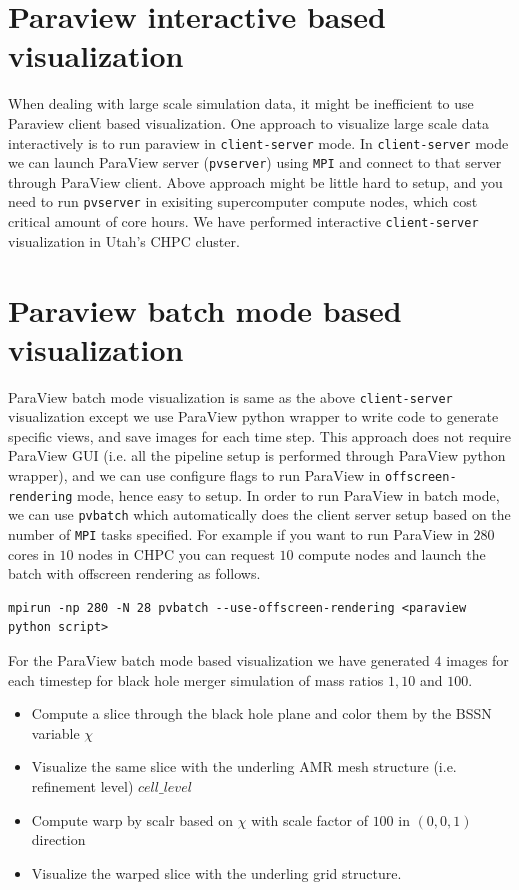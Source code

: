 \section{Paraview interactive based visualization}
When dealing with large scale simulation data, it might be inefficient to use Paraview client based visualization. One approach to visualize large scale data interactively is to run paraview in \texttt{client-server} mode. 
In \texttt{client-server} mode we can launch ParaView server (\texttt{pvserver}) using \texttt{MPI} and connect to that server through ParaView client. Above approach might be little hard to setup, and you need to run \texttt{pvserver} in 
exisiting supercomputer compute nodes, which cost critical amount of core hours. We have performed interactive \texttt{client-server} visualization in Utah's CHPC cluster. 

\section{Paraview batch mode based visualization}
ParaView batch mode visualization is same as the above \texttt{client-server} visualization except we use ParaView python wrapper to write code to generate specific views, and save images for each time step. This approach does not require 
ParaView GUI (i.e. all the pipeline setup is performed through ParaView python wrapper), and we can use configure flags to run ParaView in \texttt{offscreen-rendering} mode, hence easy to setup. In order to run ParaView in batch mode, 
we can use \texttt{pvbatch} which automatically does the client server setup based on the number of \texttt{MPI} tasks specified. For example if you want to run ParaView in $280$ cores in $10$ nodes in CHPC you can request $10$
compute nodes and launch the batch with offscreen rendering as follows. 

\begin{lstlisting}[basicstyle=\small]
mpirun -np 280 -N 28 pvbatch --use-offscreen-rendering <paraview python script>
\end{lstlisting}

For the ParaView batch mode based visualization we have generated $4$ images for each timestep for black hole merger simulation of mass ratios $1,10$ and $100$. 
\begin{itemize}
    \item Compute a slice through the black hole plane and color them by the BSSN variable $\chi$
    \item Visualize the same slice with the underling AMR mesh structure (i.e. refinement level) $cell\_level$    
    \item Compute warp by scalr based on $\chi$ with scale factor of $100$ in $(0,0,1)$ direction
    \item Visualize the warped slice with the underling grid structure. 
\end{itemize}

